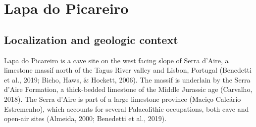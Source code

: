 \documentclass[12pt,twoside]{reedthesis}
\begin{document}
\hypertarget{lapa-do-picareiro}{%
\chapter{Lapa do Picareiro}\label{lapa-do-picareiro}}

\hypertarget{localization-and-geologic-context-1}{%
\section{Localization and geologic context}\label{localization-and-geologic-context-1}}

Lapa do Picareiro is a cave site on the west facing slope of Serra d'Aire, a limestone massif north of the Tagus River valley and Lisbon, Portugal (Benedetti et al., 2019; Bicho, Haws, \& Hockett, 2006). The massif is underlain by the Serra d'Aire Formation, a thick-bedded limestone of the Middle Jurassic age (Carvalho, 2018). The Serra d'Aire is part of a large limestone province (Maciço Calcário Estremenho), which accounts for several Palaeolithic occupations, both cave and open-air sites (Almeida, 2000; Benedetti et al., 2019).
\end{document}
